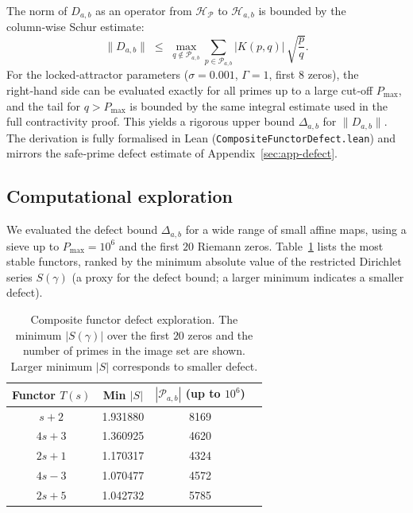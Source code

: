\documentclass[11pt,reqno]{amsart}
\theoremstyle{definition}
\theoremstyle{remark}
\begin{document}
The norm of \(D_{a,b}\) as an operator from \(\mathcal H_{\mathcal P}\) to \(\mathcal H_{a,b}\) is bounded by the column‑wise Schur estimate:
\begin{equation}\label{eq:defect-schur}
\|D_{a,b}\| \;\le\; \max_{q\notin\mathcal P_{a,b}} \sum_{p\in\mathcal P_{a,b}} |K(p,q)|\, \sqrt{\frac{p}{q}}.
\end{equation}
For the locked‑attractor parameters (\(\sigma=0.001\), \(\Gamma=1\), first \(8\) zeros), the right‑hand side can be evaluated exactly for all primes up to a large cut‑off \(P_{\max}\), and the tail for \(q>P_{\max}\) is bounded by the same integral estimate used in the full contractivity proof.  This yields a rigorous upper bound \(\Delta_{a,b}\) for \(\|D_{a,b}\|\).  The derivation is fully formalised in Lean (\texttt{CompositeFunctorDefect.lean}) and mirrors the safe‑prime defect estimate of Appendix~\ref{sec:app-defect}.

\subsection{Computational exploration}
\label{sec:exploration}

We evaluated the defect bound \(\Delta_{a,b}\) for a wide range of small affine maps, using a sieve up to \(P_{\max}=10^6\) and the first \(20\) Riemann zeros.  Table~\ref{tab:functor-defects} lists the most stable functors, ranked by the minimum absolute value of the restricted Dirichlet series \(S(\gamma)\) (a proxy for the defect bound; a larger minimum indicates a smaller defect).

\begin{table}[h]
\centering
\caption{Composite functor defect exploration.  The minimum \(|S(\gamma)|\) over the first \(20\) zeros and the number of primes in the image set are shown.  Larger minimum \(|S|\) corresponds to smaller defect.}
\label{tab:functor-defects}
\begin{tabular}{c c c c}
\toprule
Functor \(T(s)\) & Min \(|S|\) & \(|\mathcal P_{a,b}|\) (up to \(10^6\)) \\
\midrule
\(s+2\)   & 1.931880 & 8169 \\
\(4s+3\)  & 1.360925 & 4620 \\
\(2s+1\)  & 1.170317 & 4324 \\
\(4s-3\)  & 1.070477 & 4572 \\
\(2s+5\)  & 1.042732 & 5785 \\
\bottomrule
\end{tabular}
\end{table}
\end{document}

